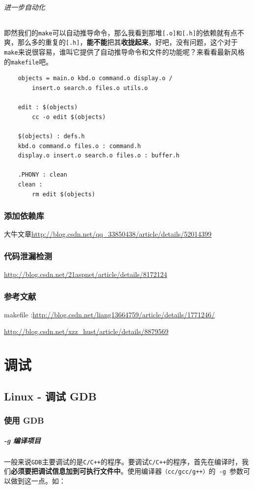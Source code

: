 \documentclass[UTF8,a4paper,12pt]{ctexbook} %
\begin{document}
			\subparagraph{进一步自动化}即然我们的\verb|make|可以自动推导命令，那么我看到那堆\verb|[.o]和[.h]|的依赖就有点不爽，那么多的重复的\verb|[.h]|，\textbf{能不能}把其\textbf{收拢起来}，好吧，没有问题，这个对于\verb|make|来说很容易，谁叫它提供了自动推导命令和文件的功能呢？来看看最新风格的\verb|makefile|吧。
			
				\begin{lstlisting}
	objects = main.o kbd.o command.o display.o /
		insert.o search.o files.o utils.o
		
	edit : $(objects)
		cc -o edit $(objects)
		
	$(objects) : defs.h
	kbd.o command.o files.o : command.h
	display.o insert.o search.o files.o : buffer.h
	
	.PHONY : clean
	clean :
		rm edit $(objects)
				\end{lstlisting}
		\subsection{添加依赖库}
		
			大牛文章\url{http://blog.csdn.net/qq_33850438/article/details/52014399}	
		\subsection{代码泄漏检测}
			\url{http://blog.csdn.net/21aspnet/article/details/8172124}
			
		\subsection{参考文献}
		
			makefile :\url{http://blog.csdn.net/liang13664759/article/details/1771246/}
			
			\url{http://blog.csdn.net/xzz_hust/article/details/8879569}

\chapter{调试}			
	\section{Linux - 调试 GDB}
		\subsection{使用 GDB}
			\paragraph{-g 编译项目}
				一般来说\verb|GDB|主要调试的是\verb|C/C++|的程序。要调试\verb|C/C++|的程序，首先在编译时，我们\textbf{必须要把调试信息加到可执行文件中}。使用编译器\verb|（cc/gcc/g++）|的\verb| -g |参数可以做到这一点。如：
				
\end{document}
